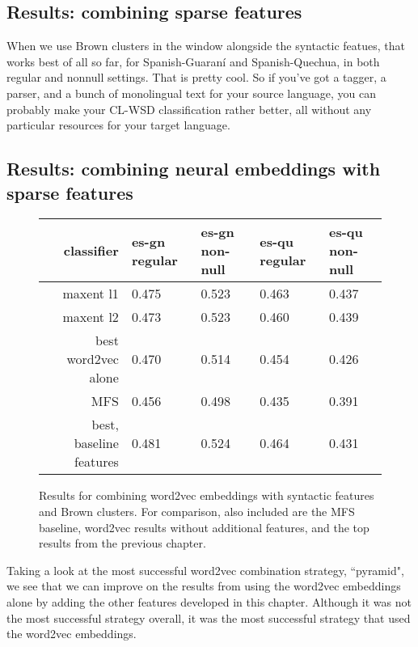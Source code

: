 \subsection{Results: combining sparse features}
When we use Brown clusters in the window alongside the syntactic featues, that
works best of all so far, for Spanish-Guaraní and Spanish-Quechua, in both
regular and nonnull settings. That is pretty cool. So if you've got a tagger,
a parser, and a bunch of monolingual text for your source language, you can
probably make your CL-WSD classification rather better, all without any
particular resources for your target language.


\subsection{Results: combining neural embeddings with sparse features}
\begin{figure*}
  \begin{centering}
  \begin{tabulary}{\textwidth}{|R|L|L|L|L|}
    \hline
    classifier & es-gn regular & es-gn non-null & es-qu regular & es-qu non-null \\
    \hline
    maxent l1 & 0.475 & 0.523 & 0.463 & 0.437 \\
    \hline
    maxent l2 & 0.473 & 0.523 & 0.460 & 0.439 \\
    \hline
    best word2vec alone & 0.470 & 0.514 & 0.454 & 0.426 \\
    \hline
    MFS    & 0.456 & 0.498 & 0.435 & 0.391 \\
    \hline
    best, baseline features & 0.481 & 0.524 & 0.464 & 0.431 \\
    \hline
  \end{tabulary}
  \end{centering}
  \caption{Results for combining word2vec embeddings with syntactic features
  and Brown clusters. For comparison, also included are the MFS baseline,
  word2vec results without additional features, and the top results from the
  previous chapter.}
  \label{fig:pyramid-extras-results}
\end{figure*}

Taking a look at the most successful word2vec combination strategy, ``pyramid",
we see that we can improve on the results from using the word2vec embeddings
alone by adding the other features developed in this chapter. Although it was
not the most successful strategy overall, it was the most successful strategy
that used the word2vec embeddings.

